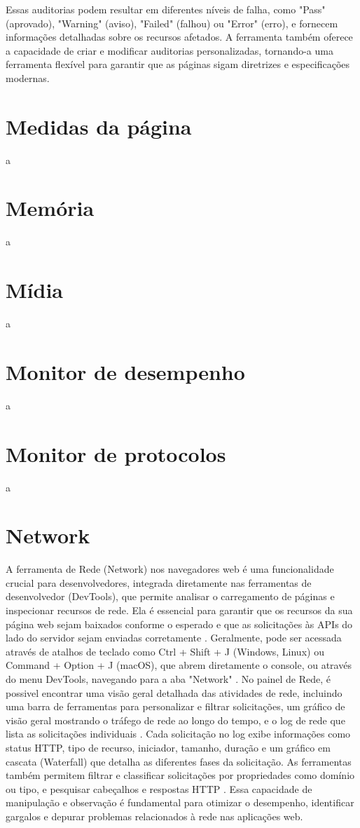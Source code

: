 Essas auditorias podem resultar em diferentes níveis de falha, como "Pass" (aprovado), "Warning" (aviso), "Failed" (falhou) ou "Error" (erro), e fornecem informações detalhadas sobre os recursos afetados. A ferramenta também oferece a capacidade de criar e modificar auditorias personalizadas, tornando-a uma ferramenta flexível para garantir que as páginas sigam diretrizes e especificações modernas.

\section{Medidas da página}
a

\section{Memória}
a

\section{Mídia}
a

\section{Monitor de desempenho}
a

\section{Monitor de protocolos}
a

\section{Network}
A ferramenta de Rede (Network) nos navegadores web é uma funcionalidade crucial para desenvolvedores, integrada diretamente nas ferramentas de desenvolvedor (DevTools), que permite analisar o carregamento de páginas e inspecionar recursos de rede. Ela é essencial para garantir que os recursos da sua página web sejam baixados conforme o esperado e que as solicitações às APIs do lado do servidor sejam enviadas corretamente \cite{edge}. Geralmente, pode ser acessada através de atalhos de teclado como Ctrl + Shift + J (Windows, Linux) ou Command + Option + J (macOS), que abrem diretamente o console, ou através do menu DevTools, navegando para a aba "Network"
.
No painel de Rede, é possivel encontrar uma visão geral detalhada das atividades de rede, incluindo uma barra de ferramentas para personalizar e filtrar solicitações, um gráfico de visão geral mostrando o tráfego de rede ao longo do tempo, e o log de rede que lista as solicitações individuais \cite{apple}. Cada solicitação no log exibe informações como status HTTP, tipo de recurso, iniciador, tamanho, duração e um gráfico em cascata (Waterfall) que detalha as diferentes fases da solicitação. As ferramentas também permitem filtrar e classificar solicitações por propriedades como domínio ou tipo, e pesquisar cabeçalhos e respostas HTTP \cite{chrome}. Essa capacidade de manipulação e observação é fundamental para otimizar o desempenho, identificar gargalos e depurar problemas relacionados à rede nas aplicações web.

